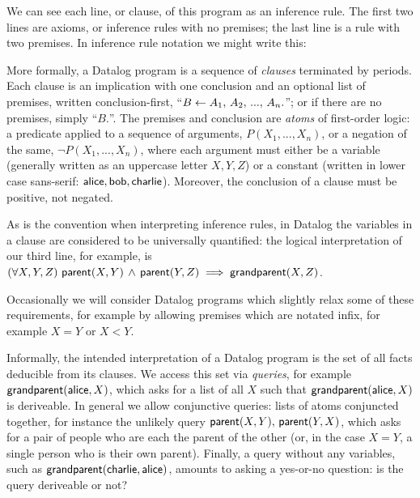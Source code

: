 \noindent
We can see each line, or clause, of this program as an inference rule. The first
two lines are axioms, or inference rules with no premises; the last line is a
rule with two premises. In inference rule notation we might write this:
%
\begin{mathpar}


\end{mathpar}

\noindent
More formally, a Datalog program is a sequence of \emph{clauses} terminated by
periods. Each clause is an implication with one conclusion and an optional list
of premises, written conclusion-first, ``$B \gets A_1 \conj A_2 \conj ... \conj
A_n.$''; or if there are no premises, simply ``$B.$''. The premises and
conclusion are \emph{atoms} of first-order logic: a predicate applied to a
sequence of arguments, $P(X_1, ..., X_n)$, or a negation of the same, $\neg
P(X_1, ..., X_n)$, where each argument must either be a variable (generally
written as an uppercase letter $X,Y,Z$) or a constant (written in lower case
sans-serif: $\datum{alice}, \datum{bob}, \datum{charlie}$). Moreover, the
conclusion of a clause must be positive, not negated.

As is the convention when interpreting inference rules, in Datalog the variables
in a clause are considered to be universally quantified: the logical
interpretation of our third line, for example, is $\fa{X, Y, Z} \atom{parent}{X,
  Y} \wedge \atom{parent}{Y, Z} \implies \atom{grandparent}{X, Z}$.

Occasionally we will consider Datalog programs which slightly relax some of
these requirements, for example by allowing premises which are notated infix,
for example $X = Y$ or $X < Y$.

Informally, the intended interpretation of a Datalog program is the set of all
facts deducible from its clauses. We access this set via \emph{queries}, for
example $\atom{grandparent}{\datum{alice},X}$, which asks for a list of all $X$
such that $\atom{grandparent}{\datum{alice},X}$ is deriveable. In general we
allow conjunctive queries: lists of atoms conjuncted together, for instance the
unlikely query $\atom{parent}{X,Y} \conj \atom{parent}{Y,X}$, which asks for a
pair of people who are each the parent of the other (or, in the case $X = Y$, a
single person who is their own parent). Finally, a query without any variables,
such as $\atom{grandparent}{\datum{charlie}, \datum{alice}}$, amounts to asking a
yes-or-no question: is the query deriveable or not?

